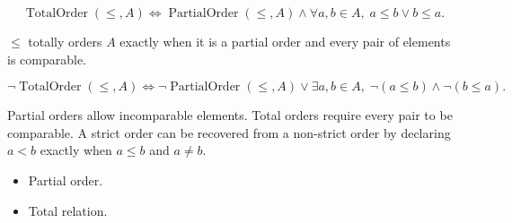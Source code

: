 \begin{remark*}
\[
\operatorname{TotalOrder}(\leq,A)
\Longleftrightarrow
\operatorname{PartialOrder}(\leq,A)
\land
\forall a,b\in A,\; a\leq b \lor b\leq a.
\]
\end{remark*}

\begin{remark*}
$\leq$ totally orders $A$ exactly when it is a partial order and every pair of
elements is comparable.
\end{remark*}

\begin{remark*}
\[
\neg\operatorname{TotalOrder}(\leq,A)
\Longleftrightarrow
\neg\operatorname{PartialOrder}(\leq,A)
\lor
\exists a,b\in A,\; \lnot(a\leq b)\land\lnot(b\leq a).
\]
\end{remark*}

\begin{remark*}[Interpretation]
Partial orders allow incomparable elements.  Total orders require every pair
to be comparable.  A strict order can be recovered from a non-strict order by
declaring $a<b$ exactly when $a\leq b$ and $a\neq b$.
\end{remark*}

\begin{remark*}[Dependencies]
\begin{itemize}
  \item Partial order.
  \item Total relation.
\end{itemize}
\end{remark*}
